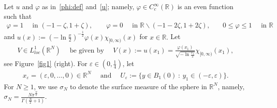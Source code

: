 \documentclass[11pt]{article}
\newcommand{\eps}{{\varepsilon}}
\newcommand{\R}{\mathbb{R}}
\numberwithin{equation}{section}
\begin{document}
Let $u$ and $\varphi$ as in~\eqref{phi:def} and~\eqref{u}; namely, $\varphi\in C^\infty_c(\R)$ is an even function such that
\begin{align*}
\varphi=1\quad\text{ in $(-1-\zeta,1+\zeta)$},\qquad 
\varphi=0\quad \text{ in $\R\backslash (-1-2\zeta,1+2\zeta)$,}\qquad
0\leq \varphi \leq 1\quad \text{ in $\R$}
\end{align*}
and $u(x):=(-\ln \frac{x}{2})^{-\frac{1}{2}}\varphi(x)\chi_{[0,\infty)}(x)$ for $x\in\R.$  Let
\begin{align}\label{V}
V \in L^1_{loc}(\R^N)\quad \text{ be given by }\quad V(x):=u(x_1)=\frac{\varphi(x_1)}{\sqrt{-\ln \frac{x_1}{2}}}\chi_{[0,\infty)}(x_1),
\end{align}
see Figure~\ref{fig1} (right).  For $\eps\in(0,\frac{1}{4})$, let
\begin{align*}
x_\eps=(\eps,0,\ldots,0)\in\R^N\quad \text{ and }\quad U_\eps:=\{y\in B_1(0)\::\: y_1\in(-\eps,\eps)\}.
\end{align*}
For $N\geq 1$, we use $\sigma_N$ to denote the surface measure of the sphere in $\R^N$, namely, $\sigma_N=\frac{N\pi^\frac{N}{2}}{\Gamma(\frac{N}{2}+1)}$.
\end{document}
